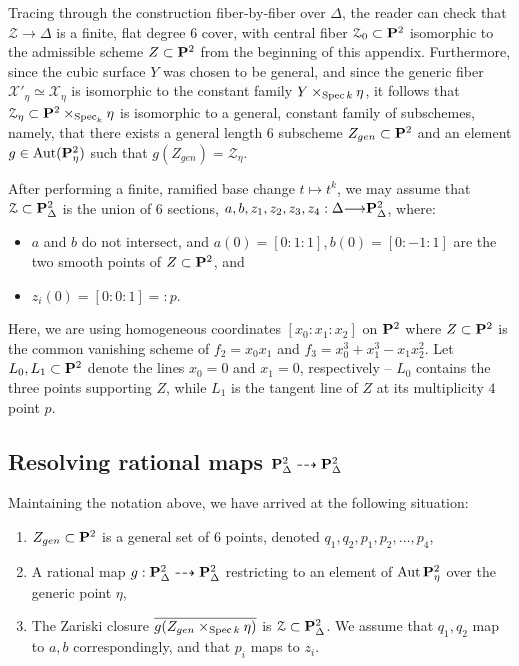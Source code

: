 \documentclass[12pt,reqno]{amsart}
\renewcommand{\k}{k}
\renewcommand{\to}{{\longrightarrow}}
\numberwithin{equation}{section}
\begin{document}
Tracing through the construction fiber-by-fiber over $\Delta$, the
reader can check that $\mathcal{Z} \to \Delta$ is a finite, flat
degree $6$ cover, with central fiber $\mathcal{Z}_{0} \subset \P^{2}$
isomorphic to the admissible scheme $Z \subset \P^{2}$ from the
beginning of this appendix.  Furthermore, since the cubic surface $Y$
was chosen to be general, and since the generic fiber
$\mathcal{X'}_{\eta} \simeq \mathcal{X}_{\eta}$ is isomorphic to the
constant family $Y \times _{\spec \k} \eta$, it follows that
$\mathcal{Z}_{\eta} \subset \P^{2} \times_{\spec _{\k}} \eta$ is
isomorphic to a general, constant family of subschemes, namely, that
there exists a general length $6$ subscheme $Z_{gen} \subset \P^{2}$
and an element $g \in \Aut (\P^{2}_{\eta})$ such that
$g(Z_{gen}) = \mathcal{Z}_{\eta}$.

After performing a finite, ramified base change $t \mapsto t^{k}$, we
may assume that $\mathcal{Z} \subset \P^{2}_{\Delta}$ is the union of
$6$ sections,
$a, b, z_{1}, z_{2}, z_{3}, z_{4}: \Delta \to \P^{2}_{\Delta}$, where:
\begin{itemize}
\item $a$ and $b$ do not intersect, and
  $a(0) = [0:1:1], b(0) = [0:-1:1]$ are the two smooth points of
  $Z \subset \P^{2}$, and
\item $z_{i}(0) =[0:0:1] =: p$.
\end{itemize}
Here, we are using homogeneous coordinates $[x_0 :x_1 : x_2]$ on
$\P^{2}$ where $Z \subset \P^{2}$ is the common vanishing scheme of
$f_{2} = x_0 x_1$ and $f_3 = x_0^3+x_1^3-x_1x_2^2$.  Let
$L_{0}, L_{1} \subset \P^{2}$ denote the lines $x_0 = 0$ and $x_1=0$,
respectively -- $L_0$ contains the three points supporting $Z$, while
$L_1$ is the tangent line of $Z$ at its multiplicity $4$ point $p$.


\subsection{Resolving rational maps $\P^{2}_{\Delta} \dashrightarrow \P^{2}_{\Delta}$}
\label{sec:resolv-rati-maps}

Maintaining the notation above, we have arrived at the following
situation:
\begin{enumerate}
\item $Z_{gen} \subset \P^{2}$ is a general set of $6$ points, denoted $q_{1}, q_{2}, p_{1}, p_{2}, \dots, p_{4}$,\\
\item A rational map
  $g : \P^{2}_{\Delta} \dashrightarrow \P^{2}_{\Delta}$ restricting to
  an element of $\Aut \P^{2}_{\eta}$ over the generic point $\eta$, \\
\item The Zariski closure
  $\overline{g(Z_{gen} \times_{\spec \k} \eta)}$ is
  $\mathcal{Z} \subset \P^{2}_{\Delta}$.  We assume that
  $q_{1}, q_{2}$ map to $a,b$ correspondingly, and that $p_{i}$ maps
  to $z_{i}$.
\end{enumerate}
\end{document}
